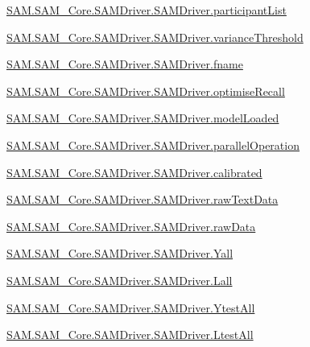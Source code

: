 \begin{DoxyCompactItemize}
\item 
\hyperlink{group__icubclient__SAM__Drivers_ga8a072edf4ea7097a7524c6f691e7d6a8}{S\+A\+M.\+S\+A\+M\+\_\+\+Core.\+S\+A\+M\+Driver.\+S\+A\+M\+Driver.\+participant\+List}
\item 
\hyperlink{group__icubclient__SAM__Drivers_gaf9de3e104bba0f3944bb9a23b328d684}{S\+A\+M.\+S\+A\+M\+\_\+\+Core.\+S\+A\+M\+Driver.\+S\+A\+M\+Driver.\+variance\+Threshold}
\item 
\hyperlink{group__icubclient__SAM__Drivers_ga1095171ae626372dde87a71f9d9263ce}{S\+A\+M.\+S\+A\+M\+\_\+\+Core.\+S\+A\+M\+Driver.\+S\+A\+M\+Driver.\+fname}
\item 
\hyperlink{group__icubclient__SAM__Drivers_gad8dfb72012bbcecd068e7ad4271c609e}{S\+A\+M.\+S\+A\+M\+\_\+\+Core.\+S\+A\+M\+Driver.\+S\+A\+M\+Driver.\+optimise\+Recall}
\item 
\hyperlink{group__icubclient__SAM__Drivers_ga820552da530ea75cc7109c7e450b7e31}{S\+A\+M.\+S\+A\+M\+\_\+\+Core.\+S\+A\+M\+Driver.\+S\+A\+M\+Driver.\+model\+Loaded}
\item 
\hyperlink{group__icubclient__SAM__Drivers_gaf6e991ba9bb10709f700208591849c4d}{S\+A\+M.\+S\+A\+M\+\_\+\+Core.\+S\+A\+M\+Driver.\+S\+A\+M\+Driver.\+parallel\+Operation}
\item 
\hyperlink{group__icubclient__SAM__Drivers_gabca45237d0107c510889d82d283fbaec}{S\+A\+M.\+S\+A\+M\+\_\+\+Core.\+S\+A\+M\+Driver.\+S\+A\+M\+Driver.\+calibrated}
\item 
\hyperlink{group__icubclient__SAM__Drivers_ga34a0d852321cad5abdc8fd4d514e60fa}{S\+A\+M.\+S\+A\+M\+\_\+\+Core.\+S\+A\+M\+Driver.\+S\+A\+M\+Driver.\+raw\+Text\+Data}
\item 
\hyperlink{group__icubclient__SAM__Drivers_ga7e5bd4edc32a108d5641cf7343887b6c}{S\+A\+M.\+S\+A\+M\+\_\+\+Core.\+S\+A\+M\+Driver.\+S\+A\+M\+Driver.\+raw\+Data}
\item 
\hyperlink{group__icubclient__SAM__Drivers_ga99651a34f71273b720039e8f4d4b03a4}{S\+A\+M.\+S\+A\+M\+\_\+\+Core.\+S\+A\+M\+Driver.\+S\+A\+M\+Driver.\+Yall}
\item 
\hyperlink{group__icubclient__SAM__Drivers_ga4b259685c2b7fddfc554f75eee45389a}{S\+A\+M.\+S\+A\+M\+\_\+\+Core.\+S\+A\+M\+Driver.\+S\+A\+M\+Driver.\+Lall}
\item 
\hyperlink{group__icubclient__SAM__Drivers_ga61bc4612a1dd3b5d593798bb7e338c81}{S\+A\+M.\+S\+A\+M\+\_\+\+Core.\+S\+A\+M\+Driver.\+S\+A\+M\+Driver.\+Ytest\+All}
\item 
\hyperlink{group__icubclient__SAM__Drivers_ga47bb2e79cf8b5f8e071ab6208cf25dd0}{S\+A\+M.\+S\+A\+M\+\_\+\+Core.\+S\+A\+M\+Driver.\+S\+A\+M\+Driver.\+Ltest\+All}

\end{DoxyCompactItemize}
